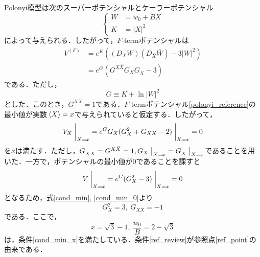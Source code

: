 \documentclass[a4paper,uplatex,dvipdfmx,10pt]{jsarticle}
\theoremstyle{definition}
\begin{document}
Polonyi模型は次のスーパーポテンシャルとケーラーポテンシャル
\begin{equation}
   \left\{
      \begin{alignedat}{1}
         W
         &=
         w_{0}
         +
         B X
         \\
         K
         &=
         |X|^2
      \end{alignedat}
   \right.
   \nonumber
\end{equation}
によって与えられる．したがって，$F$-termポテンシャルは
\begin{align}
   V^{(F)}
   &=
   e^{K}
   \left(
      (D_{X}W)
      (D_{\bar{X}}\bar{W})
      -
      3|W|^2
   \right)
   \nonumber
   \\
   &=
   e^{G}
   \left(  
      G^{X\bar{X}}
      G_{X}G_{\bar{X}}
      -
      3
   \right)
   \label{Plonyi_F-term_potential}
\end{align}
である．ただし，
\begin{equation}
   G
   \equiv
   K+\ln |W|^2
   \nonumber
\end{equation}
とした．このとき，$G^{X\bar{X}}=1$である．$F$-termポテンシャル\eqref{polonyi_reference}の最小値が実数$\ev*{X}=x$で与えられていると仮定する．したがって，
\begin{align}
   V_{X}\left.\vphantom{\frac{1}{2}}\right|_{X=x}
   =
   e^{G}
   G_{X}( G_{X}^{2}+G_{XX}-2 )
   \left.\vphantom{\frac{1}{2}}\right|_{X=x}
   =
   0
   \label{cond_min}
\end{align}
を$x$は満たす．ただし，$G_{X\bar{X}}=G^{X\bar{X}}=1, G_{X}
\left.\vphantom{\frac{1}{2}}\right|_{X=x}=G_{\bar{X}}
\left.\vphantom{\frac{1}{2}}\right|_{X=x}$であることを用いた．一方で，ポテンシャルの最小値が0であることを課すと
\begin{equation}
   V\left.\vphantom{\frac{1}{2}}\right|_{X=x}
   =
   e^{G}
   (
      G_{X}^{2}-3
   )\left.\vphantom{\frac{1}{2}}\right|_{X=x}
   =
   0
   \label{cond_min_0}
\end{equation}
となるため，式\eqref{cond_min}, \eqref{cond_min_0}より
\begin{equation}
   G_{X}^2
   =
   3
   ,\ 
   G_{XX}
   =
   -1
   \label{cond_min_x}
\end{equation}
である．ここで，
\begin{equation}
   x=\sqrt{3}-1
   ,\ 
   \frac{w_{0}}{B}
   =
   2-\sqrt{3}
   \label{ref_review}
\end{equation}
は，条件\eqref{cond_min_x}を満たしている．条件\eqref{ref_review}が参照点\eqref{ref_point}の由来である．
\end{document}

